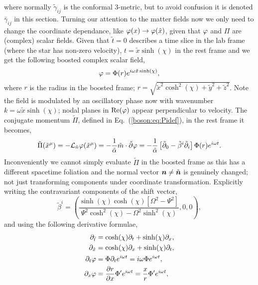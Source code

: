 where normally $\tilde{\gamma}_{ij}$ is the conformal 3-metric, but to avoid confusion it is denoted $\bar{\gamma}_{ij}$ in this section. Turning our attention to the matter fields now we only need to change the coordinate dependance, like $\varphi(x)\rightarrow \varphi(\tilde{x})$, given that $\varphi$ and $\Pi$ are (complex) scalar fields. Given that $\tilde{t}=0$ describes a time slice in the lab frame (where the star has non-zero velocity), $t = \tilde{x}\sinh(\chi)$ in the rest frame and we get the following boosted complex scalar field,
\begin{equation}\varphi = \Phi(r)e^{i\omega \tilde{x}\sinh(\chi)}, \end{equation}
where $r$ is the radius in the boosted frame; $r = \sqrt{\tilde{x}^2\cosh^2(\chi) +\tilde{y}^2 + \tilde{z}^2}$.
Note the field is modulated by an oscillatory phase now with wavenumber $k = \omega \tilde{x} \sinh(\chi)$; nodal planes in $\Re(\varphi)$ appear perpendicular to velocity. The conjugate momentum $\tilde{\Pi}$, defined in Eq.~(\ref{boson:eq:Pidef}), in the rest frame it becomes, 
\begin{equation} \tilde{\Pi}(\tilde{x}^\mu) = -\mathcal{L}_{\tilde{n}} \varphi(\tilde{x}^\mu)=-\frac{1}{\tilde{\alpha}}\tilde{m}\cdot \tilde{\partial}\varphi = -\frac{1}{\tilde{\alpha}}\left[ \tilde{\partial}_0 - \tilde{\beta}^i\tilde{\partial}_{i}\right]\Phi(r)e^{i\omega t}.\end{equation}
Inconveniently we cannot simply evaluate $\tilde{\Pi}$ in the boosted frame as this has a different spacetime foliation and the normal vector $\boldsymbol{n}\neq \tilde{\boldsymbol{n}}$ is genuinely changed; not just transforming components under coordinate transformation. Explicitly writing the contravariant components of the shift vector, 
\begin{equation} \tilde{\beta}^i = \left(\frac{\sinh (\chi)  \cosh (\chi)  \left[\Omega ^2-\Psi ^2\right]}{\Psi ^2 \cosh
   ^2(\chi) -\Omega ^2 \sinh ^2(\chi) },0,0\right),\end{equation}
and using the following derivative formulae,
\begin{align} 
{\partial}_{\tilde{t}} &= \cosh(\chi) \partial_t + \sinh(\chi) \partial_x, \\
{\partial}_{\tilde{x}} &= \cosh(\chi) \partial_x + \sinh(\chi) \partial_t,\\
 \partial_t\varphi &=\Phi\partial_te^{i\omega t} =i\omega \Phi e^{i\omega t},\\
 \partial_x\varphi &=\frac{\partial r}{\partial x}\Phi'e^{i\omega t} = \frac{x}{r}\Phi'e^{i\omega t} ,
 \end{align}
